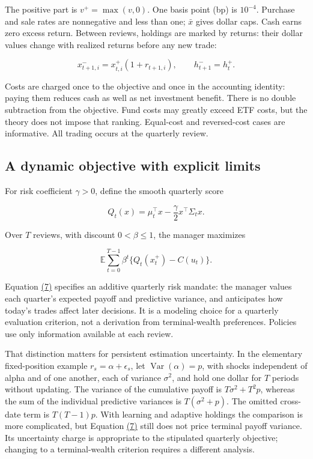 \documentclass[11pt]{article}
\begin{document}
The positive part is \(v^+=\max(v,0)\). One basis point (bp) is \(10^{-4}\). Purchase and sale rates are nonnegative and less than one; \(\bar x\) gives dollar caps. Cash earns zero excess return. Between reviews, holdings are marked by returns: their dollar values change with realized returns before any new trade:

\begin{equation*}
x^-_{t+1,i}=x^+_{t,i}(1+r_{t+1,i}),\qquad h^-_{t+1}=h^+_t.
\tag{5}\label{eq:5}
\end{equation*}

Costs are charged once to the objective and once in the accounting identity: paying them reduces cash as well as net investment benefit. There is no double subtraction from the objective. Fund costs may greatly exceed ETF costs, but the theory does not impose that ranking. Equal-cost and reversed-cost cases are informative. All trading occurs at the quarterly review.

\subsection{A dynamic objective with explicit limits}\label{sec:2.3}

For risk coefficient \(\gamma>0\), define the smooth quarterly score

\begin{equation*}
Q_t(x)=\mu_t^\top x-\frac\gamma2 x^\top\Sigma_t x.
\tag{6}\label{eq:6}
\end{equation*}

Over \(T\) reviews, with discount \(0<\beta\leq1\), the manager maximizes

\begin{equation*}
\mathbb E\sum_{t=0}^{T-1}\beta^t\{Q_t(x^+_t)-C(u_t)\}.
\tag{7}\label{eq:7}
\end{equation*}

Equation \hyperref[eq:7]{(7)} specifies an additive quarterly risk mandate: the manager values each quarter's expected payoff and predictive variance, and anticipates how today's trades affect later decisions. It is a modeling choice for a quarterly evaluation criterion, not a derivation from terminal-wealth preferences. Policies use only information available at each review.

That distinction matters for persistent estimation uncertainty. In the elementary fixed-position example \(r_s=\alpha+\epsilon_s\), let \(\operatorname{Var}(\alpha)=p\), with shocks independent of alpha and of one another, each of variance \(\sigma^2\), and hold one dollar for \(T\) periods without updating. The variance of the cumulative payoff is \(T\sigma^2+T^2p\), whereas the sum of the individual predictive variances is \(T(\sigma^2+p)\). The omitted cross-date term is \(T(T-1)p\). With learning and adaptive holdings the comparison is more complicated, but Equation \hyperref[eq:7]{(7)} still does not price terminal payoff variance. Its uncertainty charge is appropriate to the stipulated quarterly objective; changing to a terminal-wealth criterion requires a different analysis.
\end{document}
